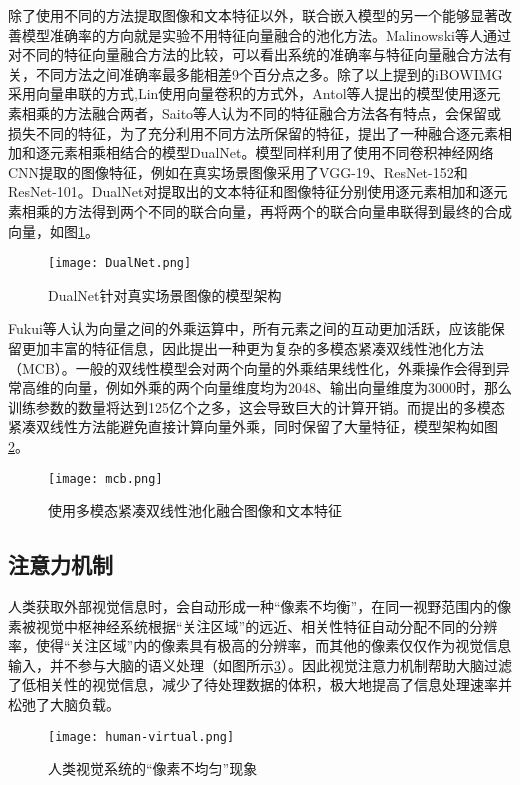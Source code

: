 除了使用不同的方法提取图像和文本特征以外，联合嵌入模型的另一个能够显著改善模型准确率的方向就是实验不用特征向量融合的池化方法。Malinowski等人通过对不同的特征向量融合方法的比较，可以看出系统的准确率与特征向量融合方法有关，不同方法之间准确率最多能相差9个百分点之多。除了以上提到的iBOWIMG采用向量串联的方式,Lin使用向量卷积的方式外，Antol等人提出的模型使用逐元素相乘的方法融合两者，Saito等人认为不同的特征融合方法各有特点，会保留或损失不同的特征，为了充分利用不同方法所保留的特征，提出了一种融合逐元素相加和逐元素相乘相结合的模型DualNet。模型同样利用了使用不同卷积神经网络CNN提取的图像特征，例如在真实场景图像采用了VGG-19、ResNet-152和ResNet-101。DualNet对提取出的文本特征和图像特征分别使用逐元素相加和逐元素相乘的方法得到两个不同的联合向量，再将两个的联合向量串联得到最终的合成向量，如图\ref{DualNet}。
\begin{figure}[H]
	\centering
	\texttt{[image: DualNet.png]}
	\caption{DualNet针对真实场景图像的模型架构}
	\label{DualNet}
\end{figure}

Fukui等人认为向量之间的外乘运算中，所有元素之间的互动更加活跃，应该能保留更加丰富的特征信息，因此提出一种更为复杂的多模态紧凑双线性池化方法（MCB）。一般的双线性模型会对两个向量的外乘结果线性化，外乘操作会得到异常高维的向量，例如外乘的两个向量维度均为2048、输出向量维度为3000时，那么训练参数的数量将达到125亿个之多，这会导致巨大的计算开销。而提出的多模态紧凑双线性方法能避免直接计算向量外乘，同时保留了大量特征，模型架构如图\ref{mcb}。
\begin{figure}[H]
	\centering
	\texttt{[image: mcb.png]}
	\caption{使用多模态紧凑双线性池化融合图像和文本特征}
	\label{mcb}
\end{figure}

\subsection{注意力机制}
人类获取外部视觉信息时，会自动形成一种“像素不均衡”，在同一视野范围内的像素被视觉中枢神经系统根据“关注区域”的远近、相关性特征自动分配不同的分辨率，使得“关注区域”内的像素具有极高的分辨率，而其他的像素仅仅作为视觉信息输入，并不参与大脑的语义处理（如图所示\ref{human-virtual}）。因此视觉注意力机制帮助大脑过滤了低相关性的视觉信息，减少了待处理数据的体积，极大地提高了信息处理速率并松弛了大脑负载。
\begin{figure}[H]
	\centering
	\texttt{[image: human-virtual.png]}
	\caption{人类视觉系统的“像素不均匀”现象}
	\label{human-virtual}
\end{figure}

